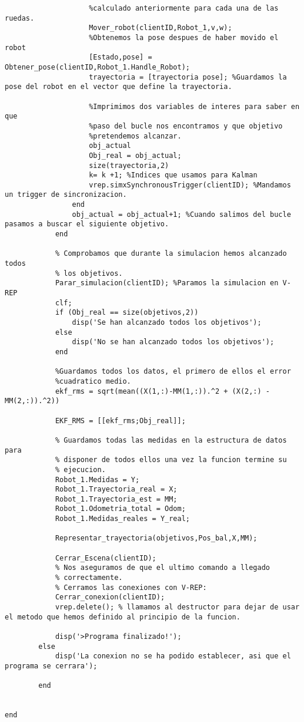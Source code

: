 \begin{lstlisting}[frame=single]
                    %Movemos el robot con los parametros que hemos
                    %calculado anteriormente para cada una de las ruedas.
                    Mover_robot(clientID,Robot_1,v,w);
                    %Obtenemos la pose despues de haber movido el robot
                    [Estado,pose] = Obtener_pose(clientID,Robot_1.Handle_Robot);
                    trayectoria = [trayectoria pose]; %Guardamos la pose del robot en el vector que define la trayectoria.

                    %Imprimimos dos variables de interes para saber en que
                    %paso del bucle nos encontramos y que objetivo
                    %pretendemos alcanzar.
                    obj_actual
                    Obj_real = obj_actual;
                    size(trayectoria,2)
                    k= k +1; %Indices que usamos para Kalman
                    vrep.simxSynchronousTrigger(clientID); %Mandamos un trigger de sincronizacion.
                end
                obj_actual = obj_actual+1; %Cuando salimos del bucle pasamos a buscar el siguiente objetivo.
            end

            % Comprobamos que durante la simulacion hemos alcanzado todos
            % los objetivos.
            Parar_simulacion(clientID); %Paramos la simulacion en V-REP
            clf;
            if (Obj_real == size(objetivos,2))
                disp('Se han alcanzado todos los objetivos');
            else 
                disp('No se han alcanzado todos los objetivos');
            end

            %Guardamos todos los datos, el primero de ellos el error
            %cuadratico medio.
            ekf_rms = sqrt(mean((X(1,:)-MM(1,:)).^2 + (X(2,:) - MM(2,:)).^2))

            EKF_RMS = [[ekf_rms;Obj_real]];
            
            % Guardamos todas las medidas en la estructura de datos para
            % disponer de todos ellos una vez la funcion termine su
            % ejecucion.
            Robot_1.Medidas = Y;
            Robot_1.Trayectoria_real = X;
            Robot_1.Trayectoria_est = MM;
            Robot_1.Odometria_total = Odom;
            Robot_1.Medidas_reales = Y_real;

            Representar_trayectoria(objetivos,Pos_bal,X,MM);
            
            Cerrar_Escena(clientID);
            % Nos aseguramos de que el ultimo comando a llegado
            % correctamente.
            % Cerramos las conexiones con V-REP:	
            Cerrar_conexion(clientID);
            vrep.delete(); % llamamos al destructor para dejar de usar el metodo que hemos definido al principio de la funcion.

            disp('>Programa finalizado!');
        else
            disp('La conexion no se ha podido establecer, asi que el programa se cerrara');

        end

    
end
\end{lstlisting}
